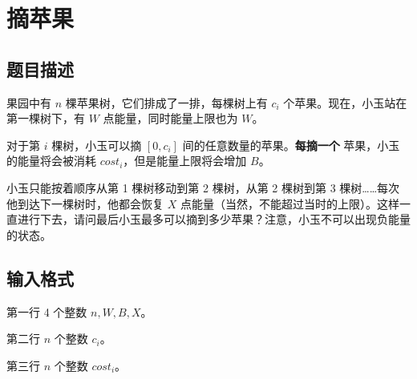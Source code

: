 \documentclass{article}
\begin{document}
	\newpage

	\section{摘苹果}

	\subsection{题目描述}

	果园中有 $n$ 棵苹果树，它们排成了一排，每棵树上有 $c_{i}$ 个苹果。现在，小玉站在第一棵树下，有 $W$ 点能量，同时能量上限也为 $W$。

	对于第 $i$ 棵树，小玉可以摘 $[0,c_{i}]$ 间的任意数量的苹果。\textbf{每摘一个} 苹果，小玉的能量将会被消耗 $cost_{i}$，但是能量上限将会增加 $B$。

	小玉只能按着顺序从第 1 棵树移动到第 2 棵树，从第 2 棵树到第 3 棵树……每次他到达下一棵树时，他都会恢复 $X$ 点能量（当然，不能超过当时的上限）。这样一直进行下去，请问最后小玉最多可以摘到多少苹果？注意，小玉不可以出现负能量的状态。

	\subsection{输入格式}

	第一行 4 个整数 $n,W,B,X$。

	第二行 $n$ 个整数 $c_{i}$。

	第三行 $n$ 个整数 $cost_{i}$。
\end{document}
